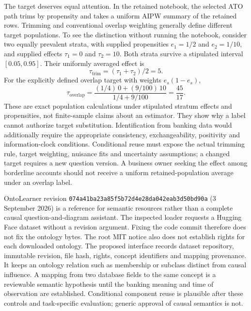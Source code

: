The target deserves equal attention. In the retained notebook, the selected
ATO path trims by propensity and takes a uniform AIPW summary of the retained
rows. Trimming and conventional overlap weighting generally define different
target populations. To see the distinction without running the notebook,
consider two equally prevalent strata, with supplied propensities $e_1=1/2$
and $e_2=1/10$, and supplied effects $\tau_1=0$ and $\tau_2=10$. Both strata
survive a stipulated interval $[0.05,0.95]$. Their uniformly averaged effect is
\begin{equation}
 \tau_{\mathrm{trim}}=(\tau_1+\tau_2)/2=5.
\end{equation}
For the explicitly defined overlap target with weights $e_s(1-e_s)$,
\begin{equation}
 \tau_{\mathrm{overlap}}=
 \frac{(1/4)\,0+(9/100)\,10}{1/4+9/100}=\frac{45}{17}.
\end{equation}
These are exact population calculations under stipulated stratum effects and
propensities, not finite-sample claims about an estimator. They show why a
label cannot authorize target substitution. Identification from banking data
would additionally require the appropriate consistency, exchangeability,
positivity and information-clock conditions. Conditional reuse must expose
the actual trimming rule, target weighting, nuisance fits and uncertainty
assumptions; a changed target requires a new question version. A business
owner seeking the effect among borderline accounts should not receive a
uniform retained-population average under an overlap label.\citep{exec13_data_oci_code,exec25_agents_choice}

OntoLearner revision
\texttt{074a41ba23a85f5b72d4}\allowbreak\texttt{e28da042eab3d50bd90a}
(3 September 2026) is a reference for semantic resources rather than a complete
causal question-and-diagram assistant. The inspected loader requests a
Hugging Face dataset without a revision argument. Fixing the code commit
therefore does not fix the ontology bytes. The root MIT notice also does not
establish rights for each downloaded ontology. The proposed interface records
dataset repository, immutable revision, file hash, rights, concept identifiers
and mapping provenance. It keeps an ontology relation such as membership or
subclass distinct from causal influence. A mapping from two database fields
to the same concept is a reviewable semantic hypothesis until the banking
meaning and time of observation are established. Conditional component reuse
is plausible after these controls and task-specific evaluation; generic
approval of causal semantics is not.\citep{exec13_data_ontolearner_code,exec25_agents_choice}

